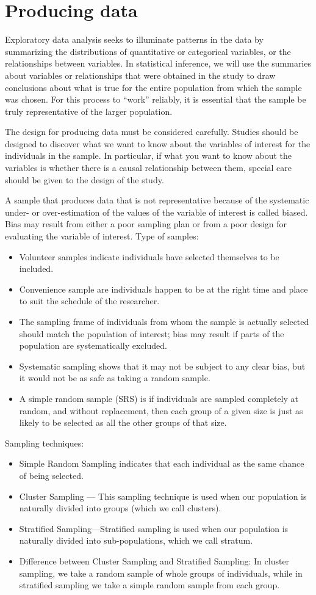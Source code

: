 \documentclass[10pt, a4paper]{article}
\begin{document}
\section{Producing data}
Exploratory data analysis seeks to illuminate patterns in the data by summarizing the distributions of quantitative or categorical variables, or the relationships between variables. In statistical inference, we will use the summaries about variables or relationships that were obtained in the study to draw conclusions about what is true for the entire population from which the sample was chosen. For this process to ``work'' reliably, it is essential that the sample be truly representative of the larger population.\par
The design for producing data must be considered carefully. Studies should be designed to discover what we want to know about the variables of interest for the individuals in the sample. In particular, if what you want to know about the variables is whether there is a causal relationship between them, special care should be given to the design of the study.\par
A sample that produces data that is not representative because of the systematic under- or over-estimation of the values of the variable of interest is called biased. Bias may result from either a poor sampling plan or from a poor design for evaluating the variable of interest.
Type of samples:
\begin{itemize}
\item Volunteer samples indicate individuals have selected themselves to be included.
\item Convenience sample are individuals happen to be at the right time and place to suit the schedule of the researcher.
\item  The sampling frame of individuals from whom the sample is actually selected should match the population of interest; bias may result if parts of the population are systematically excluded. 
\item Systematic sampling shows that it may not be subject to any clear bias, but it would not be as safe as taking a random sample.
\item A simple random sample (SRS) is if individuals are sampled completely at random, and without replacement, then each group of a given size is just as likely to be selected as all the other groups of that size.
\end{itemize}
Sampling techniques:
\begin{itemize}
\item Simple Random Sampling indicates that each individual as the same chance of being selected.
\item Cluster Sampling --- This sampling technique is used when our population is naturally divided into groups (which we call clusters).
\item Stratified Sampling—Stratified sampling is used when our population is naturally divided into sub-populations, which we call stratum.
\item Difference between Cluster Sampling and Stratified Sampling: In cluster sampling, we take a random sample of whole groups of individuals, while in stratified sampling we take a simple random sample from each group.
\end{itemize}
\end{document}
